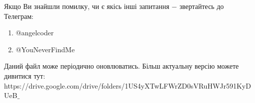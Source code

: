     
\newpage

Якщо Ви знайшли помилку, чи є якісь інші запитання $-$ звертайтесь до Телеграм:
\begin{enumerate}
    \item @angelcoder
    \item @YouNeverFindMe
\end{enumerate}
Даний файл може періодично оновлюватись. \newline
Більш актуальну версію можете дивитися тут: \newline
https://drive.google.com/drive/folders/1US4yXTwLFWrZD0sVRuHWJr591KyDUeB$\_$


 
